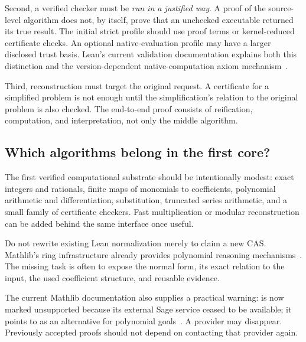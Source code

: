 \documentclass[11pt,a4paper]{article}
\newcommand{\code}[1]{\texttt{\detokenize{#1}}}
\theoremstyle{definition}
\theoremstyle{remark}
\begin{document}
Second, a verified checker must be \emph{run in a justified way}. A proof of the source-level algorithm does not, by itself, prove that an unchecked executable returned its true result. The initial strict profile should use proof terms or kernel-reduced certificate checks. An optional native-evaluation profile may have a larger disclosed trust basis. Lean's current validation documentation explains both this distinction and the version-dependent native-computation axiom mechanism~\cite{leanvalidation}.

Third, reconstruction must target the original request. A certificate for a simplified problem is not enough until the simplification's relation to the original problem is also checked. The end-to-end proof consists of reification, computation, and interpretation, not only the middle algorithm.

\subsection{Which algorithms belong in the first core?}
The first verified computational substrate should be intentionally modest: exact integers and rationals, finite maps of monomials to coefficients, polynomial arithmetic and differentiation, substitution, truncated series arithmetic, and a small family of certificate checkers. Fast multiplication or modular reconstruction can be added behind the same interface once useful.

Do not rewrite existing Lean normalization merely to claim a new CAS. Mathlib's ring infrastructure already provides polynomial reasoning mechanisms~\cite{ring}. The missing task is often to expose the normal form, its exact relation to the input, the used coefficient structure, and reusable evidence.

The current Mathlib documentation also supplies a practical warning: \code{polyrith} is now marked unsupported because its external Sage service ceased to be available; it points to \code{grobner} as an alternative for polynomial goals~\cite{polyrith}. A provider may disappear. Previously accepted proofs should not depend on contacting that provider again.

\end{document}
